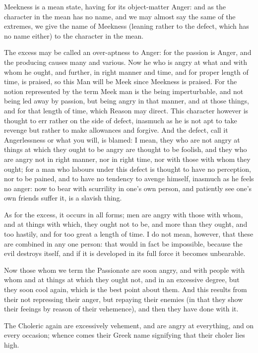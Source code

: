 
Meekness is a mean state, having for its object-matter Anger: and as the
character in the mean has no name, and we may almost say the same of the
extremes, we give the name of Meekness (leaning rather to the defect, which has
no name either) to the character in the mean.

The excess may be called an over-aptness to Anger: for the passion is Anger,
and the producing causes many and various. Now he who is angry at what and with
whom he ought, and further, in right manner and time, and for proper length of
time, is praised, so this Man will be Meek since Meekness is praised. For the
notion represented by the term Meek man is the being imperturbable, and not
being led away by passion, but being angry in that manner, and at those things,
and for that length of time, which Reason may direct. This character however is
thought to err rather on the side of defect, inasmuch as he is not apt to take
revenge but rather to make allowances and forgive. And the defect, call it
Angerlessness or what you will, is blamed: I mean, they who are not angry at
things at which they ought to be angry are thought to be foolish, and they who
are angry not in right manner, nor in right time, nor with those with whom they
ought; for a man who labours under this defect is thought to have no
perception, nor to be pained, and to have no tendency to avenge himself,
inasmuch as he feels no anger: now to bear with scurrility in one’s own
person, and patiently see one’s own friends suffer it, is a slavish
thing.

As for the excess, it occurs in all forms; men are angry with those with whom,
and at things with which, they ought not to be, and more than they ought, and
too hastily, and for too great a length of time. I do not mean, however, that
these are combined in any one person: that would in fact be impossible, because
the evil destroys itself, and if it is developed in its full force it becomes
unbearable.

Now those whom we term the Passionate are soon angry, and with people with whom
and at things at which they ought not, and in an excessive degree, but they
soon cool again, which is the best point about them. And this results from
their not repressing their anger, but repaying their enemies (in that they show
their feeings by reason of their vehemence), and then they have done with it.

The Choleric again are excessively vehement, and are angry at everything, and
on every occasion; whence comes their Greek name signifying that their choler
lies high.

